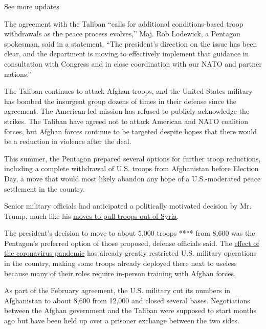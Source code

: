 \href{https://www.nytimes.com/2020/08/04/us/elections/primary-election-michigan-arizona-kansas.html?action=click\&pgtype=Article\&state=default\&region=MAIN_CONTENT_1\&context=storylines_live_updates}{See
more updates}

The agreement with the Taliban ``calls for additional conditions-based
troop withdrawals as the peace process evolves,'' Maj. Rob Lodewick, a
Pentagon spokesman, said in a statement. ``The president's direction on
the issue has been clear, and the department is moving to effectively
implement that guidance in consultation with Congress and in close
coordination with our NATO and partner nations.''

The Taliban continues to attack Afghan troops, and the United States
military has bombed the insurgent group dozens of times in their defense
since the agreement. The American-led mission has refused to publicly
acknowledge the strikes. The Taliban have agreed not to attack American
and NATO coalition forces, but Afghan forces continue to be targeted
despite hopes that there would be a reduction in violence after the
deal.

This summer, the Pentagon prepared several options for further troop
reductions, including a complete withdrawal of U.S. troops from
Afghanistan before Election Day, a move that would most likely abandon
any hope of a U.S.-moderated peace settlement in the country.

Senior military officials had anticipated a politically motivated
decision by Mr. Trump, much like his
\href{https://www.nytimes.com/2018/12/20/world/middleeast/winners-losers-syria-trumps-troops.html}{moves
to pull troops out of Syria}.

The president's decision to move to about 5,000 troops **** from 8,600
was the Pentagon's preferred option of those proposed, defense officials
said. The
\href{https://www.nytimes.com/2020/07/21/us/politics/coronavirus-military.html}{effect
of the coronavirus pandemic} has already greatly restricted U.S.
military operations in the country, making some troops already deployed
there next to useless because many of their roles require in-person
training with Afghan forces.

As part of the February agreement, the U.S. military cut its numbers in
Afghanistan to about 8,600 from 12,000 and closed several bases.
Negotiations between the Afghan government and the Taliban were supposed
to start months ago but have been held up over a prisoner exchange
between the two sides.

